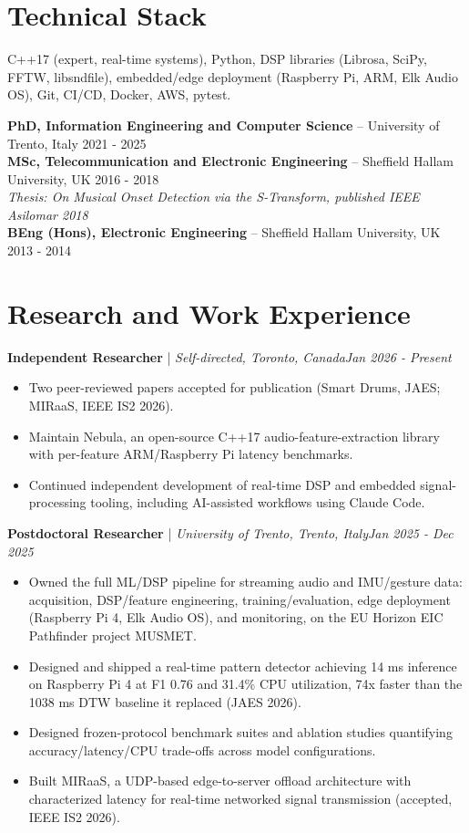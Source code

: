 \documentclass[11pt]{article}
\newenvironment{cvrole}[5]{%
  \par\noindent\textbf{\large #1} | \textit{\small #2, #3}\hfill \textit{\small #4 - #5}\par
  \begin{itemize}[leftmargin=2em, itemsep=-0.3em, topsep=-0.5em]%
}{%
  \end{itemize}\par\noindent\mbox{}\par\vspace{0.1em}%
}
\begin{document}
\section*{Technical Stack}
C++17 (expert, real-time systems), Python, DSP libraries (Librosa, SciPy, FFTW, libsndfile), embedded/edge deployment (Raspberry Pi, ARM, Elk Audio OS), Git, CI/CD, Docker, AWS, pytest.

\textbf{PhD, Information Engineering and Computer Science} -- University of Trento, Italy \hfill 2021 - 2025 \\
\textbf{MSc, Telecommunication and Electronic Engineering} -- Sheffield Hallam University, UK \hfill 2016 - 2018 \\
\textit{\small Thesis: On Musical Onset Detection via the S-Transform, published IEEE Asilomar 2018} \\
\textbf{BEng (Hons), Electronic Engineering} -- Sheffield Hallam University, UK \hfill 2013 - 2014

\section*{Research and Work Experience}

\begin{cvrole}{Independent Researcher}{Self-directed}{Toronto, Canada}{Jan 2026}{Present}
\item Two peer-reviewed papers accepted for publication (Smart Drums, JAES; MIRaaS, IEEE IS2 2026).
\item Maintain Nebula, an open-source C++17 audio-feature-extraction library with per-feature ARM/Raspberry Pi latency benchmarks.
\item Continued independent development of real-time DSP and embedded signal-processing tooling, including AI-assisted workflows using Claude Code.
\end{cvrole}

\begin{cvrole}{Postdoctoral Researcher}{University of Trento}{Trento, Italy}{Jan 2025}{Dec 2025}
\item Owned the full ML/DSP pipeline for streaming audio and IMU/gesture data: acquisition, DSP/feature engineering, training/evaluation, edge deployment (Raspberry Pi 4, Elk Audio OS), and monitoring, on the EU Horizon EIC Pathfinder project MUSMET.
\item Designed and shipped a real-time pattern detector achieving 14 ms inference on Raspberry Pi 4 at F1 0.76 and 31.4\% CPU utilization, 74x faster than the 1038 ms DTW baseline it replaced (JAES 2026).
\item Designed frozen-protocol benchmark suites and ablation studies quantifying accuracy/latency/CPU trade-offs across model configurations.
\item Built MIRaaS, a UDP-based edge-to-server offload architecture with characterized latency for real-time networked signal transmission (accepted, IEEE IS2 2026).
\end{cvrole}
\end{document}

